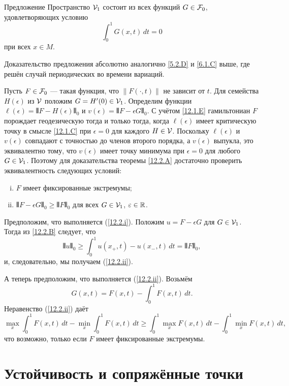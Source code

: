 \begin{thm}{Предложение}\label{12.2.B}
Пространство $\mathcal{V}_1$ состоит из всех функций $G\in\mathcal{F}_0$, удовлетворяющих условию
\[\int_0^1G(x,t)\,dt=0\]
при всех $x\in M$.
\end{thm}

Доказательство предложения абсолютно аналогично \ref{5.2.D} и \ref{6.1.C} выше, где решён случай периодических во времени вариаций.

Пусть $F\in\mathcal{F}_0$ — такая функция, что $\|F(\cdot, t)\|$ не зависит от $t$.
Для семейства $H(\epsilon)$ из $\mathcal{V}$ положим $G = H'(0)\in\mathcal{V}_1$.
Определим функции $\ell(\epsilon) = \VERT F - H(\epsilon)\VERT_0$ и $v(\epsilon) = \VERT F - \epsilon G\VERT_0$.
С учётом \ref{12.1.E} гамильтониан $F$ порождает геодезическую тогда и только тогда, когда $\ell(\epsilon)$ имеет критическую точку в смысле \ref{12.1.C} при $\epsilon= 0$ для каждого $H\in\mathcal{V}$.
Поскольку $\ell(\epsilon)$ и $v(\epsilon)$ совпадают с точностью до членов второго порядка, а $v(\epsilon)$ выпукла, это эквивалентно тому, что $v(\epsilon)$ имеет точку минимума при $\epsilon= 0$ для любого $G\in\mathcal{V}_1$.
Поэтому для доказательства теоремы \ref{12.2.A} достаточно проверить эквивалентность следующих условий:
\begin{enumerate}[(i)]
\item\label{12.2.i} $F$ имеет фиксированные экстремумы;
\item\label{12.2.ii} $\VERT F - \epsilon G\VERT_0 \ge \VERT F\VERT_0$ для всех $G\in\mathcal{V}_1$, $\varepsilon\in\mathbb{R}$.
\end{enumerate} 

Предположим, что выполняется (\ref{12.2.i}).
Положим 
$u=F-\epsilon G$ для $G\in \mathcal{V}_1$.
Тогда из \ref{12.2.B} следует, что 
\[\VERT u\VERT_0 \ge \int_0^1 u(x_+,t)-u(x_-,t)\,dt=\VERT F\VERT_0,\]
и, следовательно, мы получаем (\ref{12.2.ii}).

А теперь предположим, что выполняется (\ref{12.2.ii}).
Возьмём 
\[G(x, t) = F(x, t) - \int_0^1F(x,t)\,dt.\]
Неравенство (\ref{12.2.ii}) даёт 
\[
\max_x\!\int_0^1 F(x, t)\,dt- \min_x\!\int_0^1 F(x, t)\,dt
\ge
\int_0^1 \max_xF(x, t)\,dt-\! \int_0^1\min_x F(x, t)\,dt,
\]
что возможно, только если $F$ имеет фиксированные экстремумы.
\qeds


\section{Устойчивость и сопряжённые точки}

